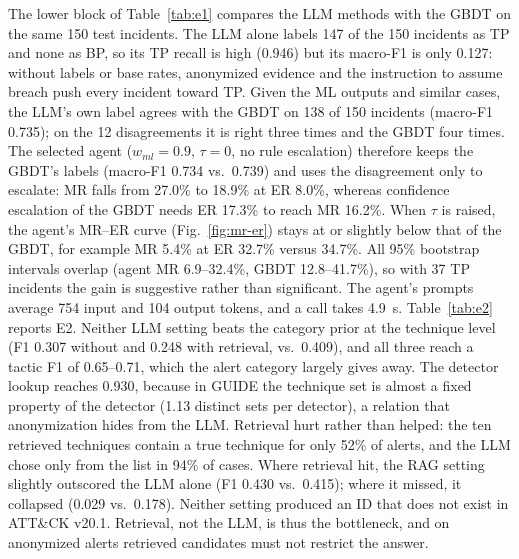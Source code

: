\documentclass[conference]{IEEEtran}
\begin{document}
The lower block of Table~\ref{tab:e1} compares the LLM methods with the
GBDT on the same 150 test incidents. The LLM alone labels 147 of the
150 incidents as TP and none as BP, so its TP recall is high (0.946) but
its macro-F1 is only 0.127: without labels or base rates, anonymized
evidence and the instruction to assume breach push every incident
toward TP. Given the ML outputs and similar cases, the LLM's own label
agrees with the GBDT on 138 of 150 incidents (macro-F1 0.735); on the 12
disagreements it is right three times and the GBDT four times. The
selected agent ($w_{ml}=0.9$, $\tau=0$, no rule escalation) therefore
keeps the GBDT's labels (macro-F1 0.734 vs.\ 0.739) and uses the
disagreement only to escalate: MR falls from 27.0\% to 18.9\% at ER
8.0\%, whereas confidence escalation of the GBDT needs ER 17.3\% to
reach MR 16.2\%. When $\tau$ is raised, the agent's MR--ER curve
(Fig.~\ref{fig:mr-er}) stays at or slightly below that of the GBDT,
for example MR 5.4\% at ER 32.7\% versus 34.7\%. All 95\% bootstrap
intervals overlap (agent MR 6.9--32.4\%, GBDT 12.8--41.7\%), so with 37
TP incidents the gain is suggestive rather than significant. The
agent's prompts average 754 input and 104 output tokens, and a call
takes 4.9~s.
Table~\ref{tab:e2} reports E2. Neither LLM setting beats the
category prior at the technique level (F1 0.307 without and 0.248 with
retrieval, vs.\ 0.409), and all three reach a tactic F1 of 0.65--0.71,
which the alert category largely gives away. The detector lookup
reaches 0.930, because in GUIDE the technique set is almost a fixed
property of the detector (1.13 distinct sets per detector), a
relation that anonymization hides from the LLM. Retrieval hurt rather
than helped: the ten retrieved techniques contain a true technique for
only 52\% of alerts, and the LLM chose only from the list in 94\% of
cases. Where retrieval hit, the RAG setting slightly outscored the
LLM alone (F1 0.430 vs.\ 0.415); where it missed, it collapsed (0.029
vs.\ 0.178). Neither setting produced an ID that does not exist in
ATT\&CK v20.1. Retrieval, not the LLM, is thus the bottleneck, and on
anonymized alerts retrieved candidates must not restrict the answer.
\end{document}
